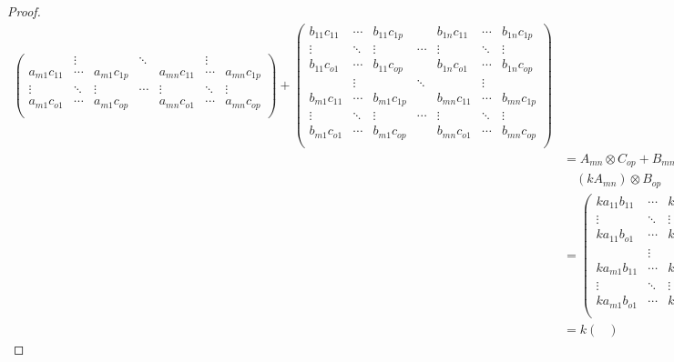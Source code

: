 \documentclass[dvipdfmx]{jsarticle}
\begin{document}
\begin{proof}
\begin{align*}
\begin{pmatrix}
\  & \vdots & \  & \ddots & \  & \vdots & \  \\
a_{m1}c_{11} & \cdots & a_{m1}c_{1p} & \  & a_{mn}c_{11} & \cdots & a_{mn}c_{1p} \\
 \vdots & \ddots & \vdots & \cdots & \vdots & \ddots & \vdots \\
a_{m1}c_{o1} & \cdots & a_{m1}c_{op} & \  & a_{mn}c_{o1} & \cdots & a_{mn}c_{op} \\
\end{pmatrix} + \begin{pmatrix}
b_{11}c_{11} & \cdots & b_{11}c_{1p} & \  & b_{1n}c_{11} & \cdots & b_{1n}c_{1p} \\
 \vdots & \ddots & \vdots & \cdots & \vdots & \ddots & \vdots \\
b_{11}c_{o1} & \cdots & b_{11}c_{op} & \  & b_{1n}c_{o1} & \cdots & b_{1n}c_{op} \\
\  & \vdots & \  & \ddots & \  & \vdots & \  \\
b_{m1}c_{11} & \cdots & b_{m1}c_{1p} & \  & b_{mn}c_{11} & \cdots & b_{mn}c_{1p} \\
 \vdots & \ddots & \vdots & \cdots & \vdots & \ddots & \vdots \\
b_{m1}c_{o1} & \cdots & b_{m1}c_{op} & \  & b_{mn}c_{o1} & \cdots & b_{mn}c_{op} \\
\end{pmatrix}\\
&= A_{mn} \otimes C_{op} + B_{mn} \otimes C_{op}\\
&\quad \left( kA_{mn} \right) \otimes B_{op}\\
&= \begin{pmatrix}
ka_{11}b_{11} & \cdots & ka_{11}b_{1p} & \  & ka_{1n}b_{11} & \cdots & ka_{1n}b_{1p} \\
 \vdots & \ddots & \vdots & \cdots & \vdots & \ddots & \vdots \\
ka_{11}b_{o1} & \cdots & ka_{11}b_{op} & \  & ka_{1n}b_{o1} & \cdots & ka_{1n}b_{op} \\
\  & \vdots & \  & \ddots & \  & \vdots & \  \\
ka_{m1}b_{11} & \cdots & ka_{m1}b_{1p} & \  & ka_{mn}b_{11} & \cdots & ka_{mn}b_{1p} \\
 \vdots & \ddots & \vdots & \cdots & \vdots & \ddots & \vdots \\
ka_{m1}b_{o1} & \cdots & ka_{m1}b_{op} & \  & ka_{mn}b_{o1} & \cdots & ka_{mn}b_{op} \\
\end{pmatrix}\\
&= k\begin{pmatrix}

\end{pmatrix}
\end{align*}
\end{proof}
\end{document}
